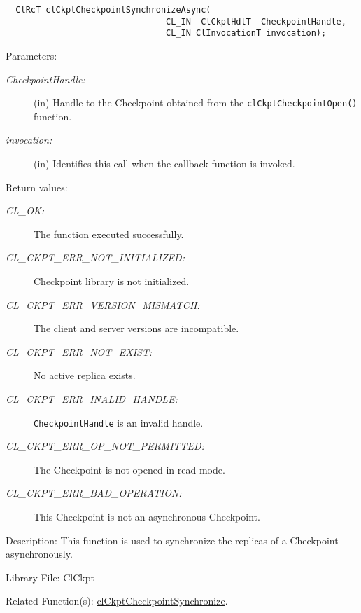 \begin{flushleft}
\begin{Desc}
\footnotesize\begin{verbatim}  ClRcT clCkptCheckpointSynchronizeAsync(
                     			CL_IN  ClCkptHdlT  CheckpointHandle,
                     			CL_IN ClInvocationT invocation);
\end{verbatim}
\normalsize
\end{Desc}
\begin{Desc}
\item[Parameters:]
\begin{description}
\item[{\em Checkpoint\-Handle:}](in) Handle to the Checkpoint obtained from the {\tt{clCkptCheckpointOpen()}} function. 
\item[{\em invocation:}](in) Identifies this call when the callback function is invoked.\end{description}
\end{Desc}
\begin{Desc}
\item[Return values:]
\begin{description}
\item[{\em CL\_\-OK:}]The function executed successfully. 
\item[{\em CL\_\-CKPT\_\-ERR\_\-NOT\_\-INITIALIZED:}]Checkpoint library is not initialized. 
\item[{\em CL\_\-CKPT\_\-ERR\_\-VERSION\_\-MISMATCH:}]The client and server versions are incompatible.
\item[{\em CL\_\-CKPT\_\-ERR\_\-NOT\_\-EXIST:}] No active replica exists.
\item[{\em CL\_\-CKPT\_\-ERR\_\-INALID\_\-HANDLE:}]{\tt{CheckpointHandle}} is an invalid handle.
\item[{\em CL\_\-CKPT\_\-ERR\_\-OP\_\-NOT\_\-PERMITTED:}] The Checkpoint is not opened in read mode.
\item[{\em CL\_\-CKPT\_\-ERR\_\-BAD\_\-OPERATION:}]This Checkpoint is not an asynchronous Checkpoint.


\end{description}
\end{Desc}
\begin{Desc}
\item[Description:]This function is used to synchronize the replicas of a Checkpoint asynchronously.\end{Desc}
\begin{Desc}
\item[Library File:]Cl\-Ckpt\end{Desc}
\begin{Desc}
\item[Related Function(s):]\hyperlink{group__group10}{cl\-Ckpt\-Checkpoint\-Synchronize}. \end{Desc}
\newpage


\end{flushleft}
